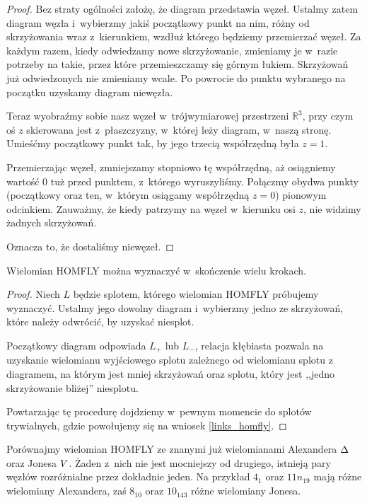 \begin{proof}
    Bez straty ogólności założę, że diagram przedstawia węzeł.
    Ustalmy zatem diagram węzła i~wybierzmy jakiś początkowy punkt na nim, różny od skrzyżowania wraz z~kierunkiem, wzdłuż którego będziemy przemierzać węzeł.
    Za każdym razem, kiedy odwiedzamy nowe skrzyżowanie, zmieniamy je w~razie potrzeby na takie, przez które przemieszczamy się górnym łukiem.
    Skrzyżowań już odwiedzonych nie zmieniamy wcale.
    Po powrocie do punktu wybranego na początku uzyskamy diagram niewęzła.

    Teraz wyobraźmy sobie nasz węzeł w~trójwymiarowej przestrzeni $\mathbb R^3$, przy czym oś $z$ skierowana jest z~płaszczyzny, w~której leży diagram, w~naszą stronę.
    Umieśćmy początkowy punkt tak, by jego trzecią współrzędną była $z = 1$.

    Przemierzając węzeł, zmniejszamy stopniowo tę współrzędną, aż osiągniemy wartość $0$ tuż przed punktem, z~którego wyruszyliśmy.
    Połączmy obydwa punkty (początkowy oraz ten, w~którym osiągamy współrzędną $z = 0$) pionowym odcinkiem.
    Zauważmy, że kiedy patrzymy na węzeł w~kierunku osi $z$, nie widzimy żadnych skrzyżowań.

    Oznacza to, że dostaliśmy niewęzeł.
\end{proof}

\begin{proposition}
    Wielomian HOMFLY można wyznaczyć w~skończenie wielu krokach.
\end{proposition}

\begin{proof}
    Niech $L$ będzie splotem, którego wielomian HOMFLY próbujemy wyznaczyć.
    Ustalmy jego dowolny diagram i~wybierzmy jedno ze skrzyżowań, które należy odwrócić, by uzyskać niesplot.

    Początkowy diagram odpowiada $L_+$ lub $L_-$, relacja kłębiasta pozwala na uzyskanie wielomianu wyjściowego splotu zależnego od wielomianu splotu z
    diagramem, na którym jest mniej skrzyżowań oraz splotu, który jest ,,jedno skrzyżowanie bliżej'' niesplotu.

    Powtarzając tę procedurę dojdziemy w~pewnym momencie do splotów trywialnych, gdzie powołujemy się na wniosek \ref{links_homfly}.
\end{proof}

Porównajmy wielomian HOMFLY ze znanymi już wielomianami Alexandera $\Delta$ oraz Jonesa $V$.
Żaden z~nich nie jest mocniejszy od drugiego, istnieją pary węzłów rozróżnialne przez dokładnie jeden.
Na przykład $4_1$ oraz $11n_{19}$ mają różne wielomiany Alexandera, zaś $8_{10}$ oraz $10_{143}$ różne wielomiany Jonesa.

